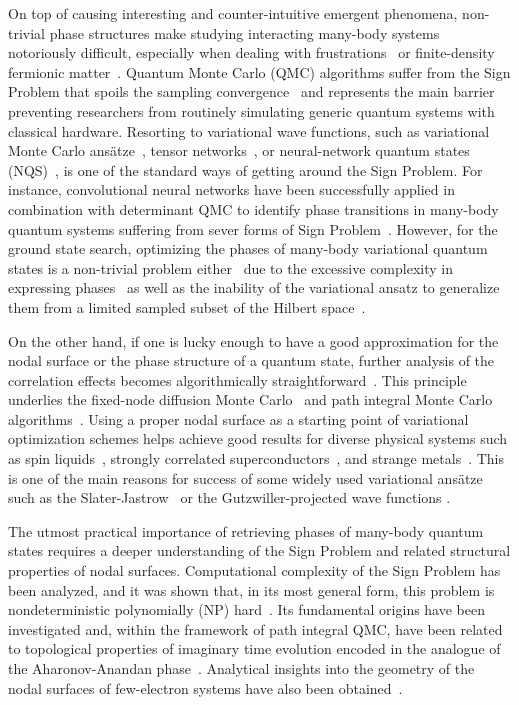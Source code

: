 On top of causing interesting and counter-intuitive emergent phenomena, non-trivial phase structures make studying interacting many-body systems notoriously difficult, especially when dealing with frustrations~\cite{frustrations} or finite-density fermionic matter~\cite{finite_density}. Quantum Monte Carlo (QMC) algorithms suffer from the Sign Problem that spoils the sampling convergence~\cite{sign_problem} and represents the main barrier preventing researchers from routinely simulating generic quantum systems with classical hardware. Resorting to variational wave functions, such as variational Monte Carlo ans\"atze~\cite{vmc}, tensor networks~\cite{Orus}, or neural-network quantum states (NQS)~\cite{Carleo}, is one of the standard ways of getting around the Sign Problem. For instance, convolutional neural networks have been successfully applied in combination with determinant QMC to identify phase transitions in many-body quantum systems suffering from sever forms of Sign Problem~\cite{Trebst}. However, for the ground state search, optimizing the phases of many-body variational quantum states is a non-trivial problem either~\cite{sign_generalization, castelnovo} due to the excessive complexity in expressing phases~\cite{kastoryano} as well as the inability of the variational ansatz to generalize them from a limited sampled subset of the Hilbert space~\cite{sign_generalization}. 

On the other hand, if one is lucky enough to have a good approximation for the nodal surface or the phase structure of a quantum state, further analysis of the correlation effects becomes algorithmically straightforward~\cite{Ceperley}. This principle underlies the fixed-node diffusion Monte Carlo~\cite{fixed_node} and path integral Monte Carlo algorithms~\cite{Ceperley_path}. Using a proper nodal surface as a starting point of variational optimization schemes helps achieve good results for diverse physical systems such as spin liquids~\cite{spin_liquids, astrakhantsev2021}, strongly correlated superconductors~\cite{Imada_SC}, and strange metals~\cite{strange_metals}. This is one of the main reasons for success of some widely used variational ans\"atze such as the Slater-Jastrow~\cite{Slater_Jastrow_1, Slater_Jastrow_2} or the Gutzwiller-projected wave functions \cite{Gutzwiller, Nomura, ferrari2019neural}.

The utmost practical importance of retrieving phases of many-body quantum states requires a deeper understanding of the Sign Problem and related structural properties of nodal surfaces. Computational complexity of the Sign Problem has been analyzed, and it was shown that, in its most general form, this problem is nondeterministic polynomially (NP) hard~\cite{NP_Troyer}. Its fundamental origins have been investigated and, within the framework of path integral QMC, have been related to topological properties of imaginary time evolution encoded in the analogue of the Aharonov-Anandan phase~\cite{Soluyanov}. Analytical insights into the geometry of the nodal surfaces of few-electron systems have also been obtained~\cite{nodal1, nodal2}.

